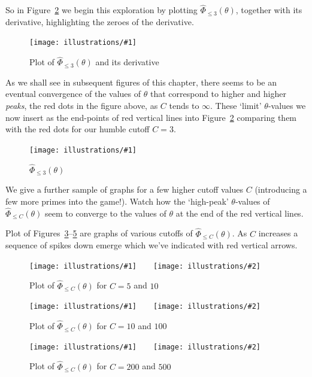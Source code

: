\documentclass[openany]{book}
\newcommand{\ill}[3]{%
   \begin{figure}[H]%
   \vspace{-2ex}
   \centering%
   \texttt{[image: illustrations/\#1]}%
   \caption{#3}%
   \vspace{-2ex}
    \end{figure}}
\newcommand{\illtwo}[4]{%
   \begin{figure}[H]\centering%
   \texttt{[image: illustrations/\#1]}$\qquad$\texttt{[image: illustrations/\#2]}%
   \caption{#4}%
    \end{figure}}
\theoremstyle{plain}
\theoremstyle{definition}
\begin{document}
  So in Figure~\ref{fig:theta_3} we begin this exploration by plotting ${\hat \Phi}_{\leq 3}(\theta)$, together with its derivative, highlighting the zeroes of the derivative.


\ill{theta_3_intro-2}{.85}{Plot of ${\hat \Phi}_{\leq 3}(\theta)$ and its derivative\label{fig:theta3}}

As we shall see in subsequent figures of this chapter, there seems to be an eventual convergence of the values of $\theta$ that correspond to higher and higher {\it peaks}, the red dots in the figure above,  as $C$ tends to $\infty$. These `limit' $\theta$-values we now insert as the end-points of red vertical lines into Figure~\ref{fig:theta_3} comparing them with the red dots for our humble cutoff $C=3$.



\ill{theta_C-3}{0.9}{${\hat \Phi}_{\leq 3}(\theta)$ \label{fig:theta_3}}



We give a further sample of graphs for a few higher cutoff values $C$ (introducing a few more primes into the game!). Watch how the `high-peak' $\theta$-values of ${\hat \Phi}_{\leq C}(\theta)$ seem to converge to the values of  $\theta$ at the end of the red vertical lines.

 Plot of
Figures~\ref{fig:theta_C-5-10}--\ref{fig:theta_C-200-500}
are graphs of various cutoffs of ${\hat \Phi}_{\leq C}(\theta)$.
As $C$ increases a sequence of spikes down emerge
which we've indicated with red vertical arrows.



 \illtwo{theta_C-5}{theta_C-10}{0.45}{Plot of ${\hat \Phi}_{\leq C}(\theta)$ for $C=5$ and $10$\label{fig:theta_C-5-10}}

\illtwo{theta_C-20}{theta_C-100}{0.45}{Plot of ${\hat \Phi}_{\leq C}(\theta)$ for $C=10$ and $100$\label{fig:theta_C-10-100}}

\illtwo{theta_C-200}{theta_C-500}{0.45}{Plot of ${\hat \Phi}_{\leq C}(\theta)$ for $C=200$ and $500$\label{fig:theta_C-200-500}}
\end{document}
